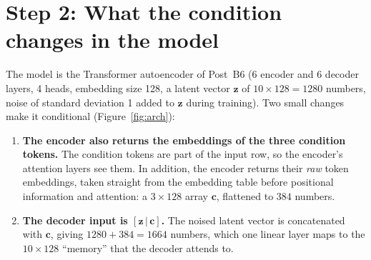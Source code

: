 \documentclass[11pt]{article}
\begin{document}
\section{Step 2: What the condition changes in the model}
The model is the Transformer autoencoder of Post~B6 (6 encoder and 6 decoder layers, 4 heads, embedding size 128, a latent vector $\bm z$ of $10\times128=1280$ numbers, noise of standard deviation 1 added to $\bm z$ during training). Two small changes make it conditional (Figure~\ref{fig:arch}):

\begin{enumerate}[nosep]
  \item \textbf{The encoder also returns the embeddings of the three condition tokens.} The condition tokens are part of the input row, so the encoder's attention layers see them. In addition, the encoder returns their \emph{raw} token embeddings, taken straight from the embedding table before positional information and attention: a $3\times128$ array $\bm c$, flattened to $384$ numbers.
  \item \textbf{The decoder input is $[\bm z\,|\,\bm c]$.} The noised latent vector is concatenated with $\bm c$, giving $1280+384=1664$ numbers, which one linear layer maps to the $10\times128$ ``memory'' that the decoder attends to.
\end{enumerate}
\end{document}
